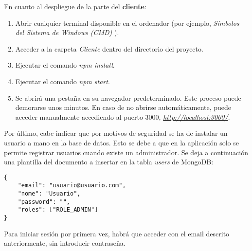 En cuanto al despliegue de la parte del {\bf cliente}:
\begin{enumerate}
\item Abrir cualquier terminal disponible en el ordenador (por ejemplo, {\it Símbolos del Sistema de Windows (CMD)} \cite{cmd}).
\item Acceder a la carpeta {\it Cliente} dentro del directorio del proyecto.
\item Ejecutar el comando {\it npm install}.
\item Ejecutar el comando {\it npm start}.
\item Se abrirá una pestaña en su navegador predeterminado. Este proceso puede demorarse unos minutos. En caso de no abrirse automáticamente, puede acceder manualmente accediendo al puerto 3000, {\it \url{http://localhost:3000/}}.
\end{enumerate}

Por último, cabe indicar que por motivos de seguridad se ha de instalar un usuario a mano en la base de datos. Esto se debe a que en la aplicación solo se permite registrar usuarios cuando existe un administrador. Se deja a continuación una plantilla del documento a insertar en la tabla {\it users} de MongoDB:

\begin{verbatim}
{
	"email": "usuario@usuario.com",
	"nome": "Usuario",
	"password": "",
	"roles": ["ROLE_ADMIN"]
}
\end{verbatim}

Para iniciar sesión por primera vez, habrá que acceder con el email descrito anteriormente, sin introducir contraseña.